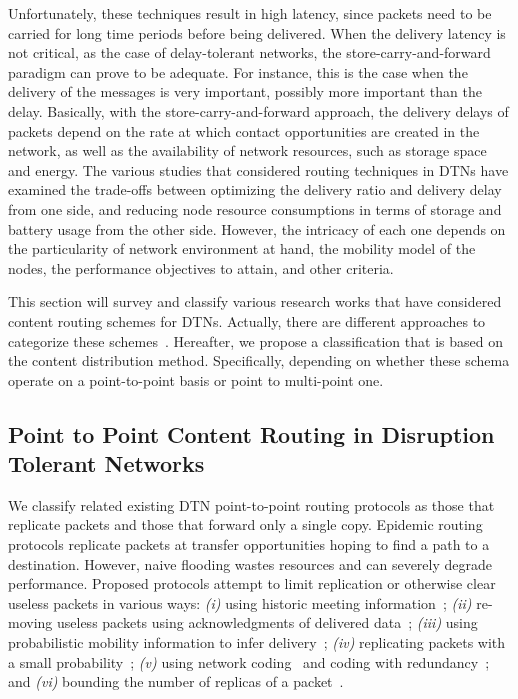 Unfortunately, these techniques result in high latency, since packets need to be carried for long time periods before being delivered. When the delivery latency is not critical, as
the case of delay-tolerant networks, the store-carry-and-forward paradigm can prove to be adequate. For instance, this is the case when the delivery of the messages is very important, possibly more important than the delay. Basically, with the store-carry-and-forward approach, the delivery delays of packets depend on the rate at which contact opportunities are created in the network, as well as the availability of network resources, such as storage space and energy. The various studies that considered routing techniques in DTNs have examined the trade-offs between optimizing the delivery ratio and delivery delay from one side, and reducing node resource consumptions in terms of storage and battery usage from the other side. However, the intricacy of each one depends on the particularity of network environment at hand, the mobility model of the nodes, the performance objectives to attain, and other criteria.

This section will survey and classify various research works that have considered content routing schemes for DTNs. Actually, there are different approaches to categorize these schemes~\cite{Ward:RoutingSurvey, DTNRoutingSurvey06}. Hereafter, we propose a classification that is based on the content distribution method. Specifically, depending on whether these schema operate on a point-to-point basis or point to multi-point one.

\subsection{Point to Point Content Routing in Disruption Tolerant Networks}

We classify related existing DTN point-to-point routing protocols as those that replicate packets and those that forward only a
single copy. Epidemic routing protocols replicate packets at transfer opportunities hoping to find a path to a destination.
However, naive flooding wastes resources and can severely degrade performance. Proposed protocols attempt to limit
replication or otherwise clear useless packets in various ways: \emph{(i)} using historic meeting information~\cite{Wearable, MVRouting, Levine:MaxProp}; \emph{(ii)} re-moving useless packets using acknowledgments of delivered data~\cite{Levine:MaxProp}; \emph{(iii)} using probabilistic mobility information to infer
delivery~\cite{Haas:wdtn}; \emph{(iv)} replicating packets with a small probability~\cite{Tseng:broadcast}; \emph{(v)} using network coding~\cite{LeBoudec:wdtn} and coding with
redundancy~\cite{Fall:Sigcomm05}; and \emph{(vi)} bounding the number of replicas of a packet~\cite{Haas:wdtn,akis:wdtn,Vahdat:epidemic}.

